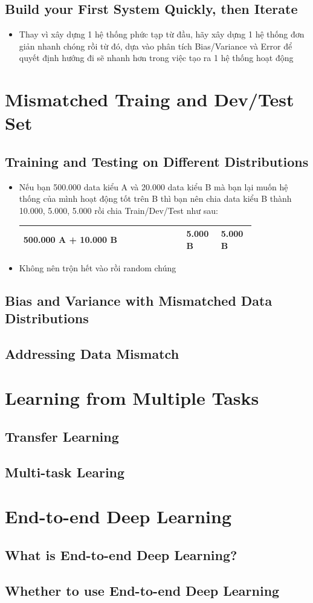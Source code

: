 \documentclass[12pt,a4paper]{report}
\begin{document}
	\section{Build your First System Quickly, then Iterate}
		\begin{itemize}
			\item Thay vì xây dựng 1 hệ thống phức tạp từ đầu, hãy xây dựng 1 hệ thống đơn giản nhanh chóng rồi từ đó, dựa vào phân tích Bias/Variance và Error để quyết định hướng đi sẽ nhanh hơn trong việc tạo ra 1 hệ thống hoạt động
		\end{itemize}
\chapter{Mismatched Traing and Dev/Test Set}
	\section{Training and Testing on Different Distributions}
		\begin{itemize}
			\item Nếu bạn 500.000 data kiểu A và 20.000 data kiểu B mà bạn lại muốn hệ thống của mình hoạt động tốt trên B thì bạn nên chia data kiểu B thành 10.000, 5.000, 5.000 rồi chia Train/Dev/Test như sau:\\
			\begin{tabular}{|p{0.6\linewidth}|p{0.1\linewidth}|p{0.1\linewidth}|}
				\hline
				500.000 A + 10.000 B & 5.000 B & 5.000 B\\
				\hline
			\end{tabular}
			\item Không nên trộn hết vào rồi random chúng
		\end{itemize}
	\section{Bias and Variance with Mismatched Data Distributions}

	\section{Addressing Data Mismatch}
\chapter{Learning from Multiple Tasks}
	\section{Transfer Learning}
	\section{Multi-task Learing}
\chapter{End-to-end Deep Learning}
	\section{What is End-to-end Deep Learning?}
	\section{Whether to use End-to-end Deep Learning}
\end{document}
